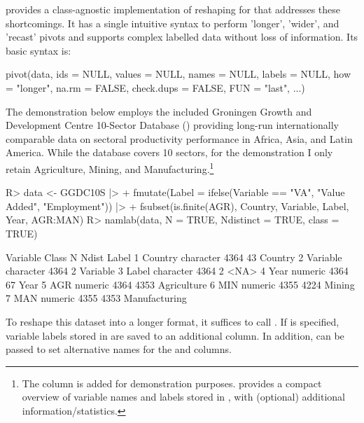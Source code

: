 \documentclass[nojss]{jss} %
\newcommand{\fct}[1]{\code{#1()}}
\begin{document}
\fct{collapse::pivot} provides a class-agnostic implementation of reshaping for  that addresses these shortcomings. It has a single intuitive syntax to perform 'longer', 'wider', and 'recast' pivots and supports complex labelled data without loss of information. Its basic syntax is: \newpage
%
\begin{Code}
pivot(data, ids = NULL, values = NULL, names = NULL, labels = NULL,
  how = "longer", na.rm = FALSE, check.dups = FALSE, FUN = "last", ...)
\end{Code}
%
The demonstration below employs the included Groningen Growth and Development Centre 10-Sector Database (\href{https://sebkrantz.github.io/collapse/reference/GGDC10S.html}{}) providing long-run internationally comparable data on sectoral productivity performance in Africa, Asia, and Latin America. While the database covers 10 sectors, for the demonstration I only retain Agriculture, Mining, and Manufacturing.\footnote{The  column is added for demonstration purposes. \fct{namlab} provides a compact overview of variable names and labels stored in , with (optional) additional information/statistics.}
%
\begin{Schunk}
\begin{Sinput}
R> data <- GGDC10S |>
+   fmutate(Label = ifelse(Variable == "VA", "Value Added", "Employment")) |>
+   fsubset(is.finite(AGR), Country, Variable, Label, Year, AGR:MAN)
R> namlab(data, N = TRUE, Ndistinct = TRUE, class = TRUE)
\end{Sinput}
\begin{Soutput}
  Variable     Class    N Ndist         Label
1  Country character 4364    43       Country
2 Variable character 4364     2      Variable
3    Label character 4364     2          <NA>
4     Year   numeric 4364    67          Year
5      AGR   numeric 4364  4353   Agriculture
6      MIN   numeric 4355  4224        Mining
7      MAN   numeric 4355  4353 Manufacturing
\end{Soutput}
\end{Schunk}
%
To reshape this dataset into a longer format, it suffices to call . If  is specified, variable labels stored in  are saved to an additional column. In addition,  can be passed to set alternative names for the  and  columns.
%
\end{document}
